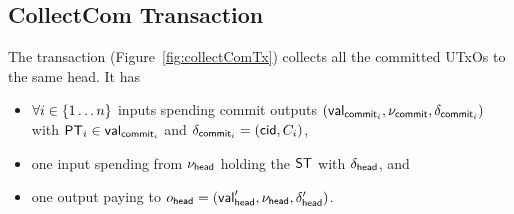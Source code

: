 \subsection{CollectCom Transaction}\label{sec:collect-tx}

\noindent The \mtxCCom{} transaction (Figure~\ref{fig:collectComTx}) collects
all the committed UTxOs to the same head. It has
\begin{itemize}
	\item $\forall i \in \{1 \dots n\}$ inputs spending commit outputs
	      $(\mathsf{val}_{\mathsf{commit}_{i}}, \nu_{\mathsf{commit}}, \delta_{\mathsf{commit}_{i}})$ with $\mathsf{PT}_{i} \in \mathsf{val}_{\mathsf{commit}_{i}}$
	      and $\delta_{\mathsf{commit}_{i}} = (\mathsf{cid}, C_{i})$,
	\item one input spending from $\nu_\mathsf{head}$ holding the $\mathsf{ST}$ with $\delta_{\mathsf{head}}$,
	      and
	\item one output paying to $o_{\mathsf{head}} = (\mathsf{val}_{\mathsf{head}}', \nu_\mathsf{head}, \delta_{\mathsf{head}}')$.
\end{itemize}

